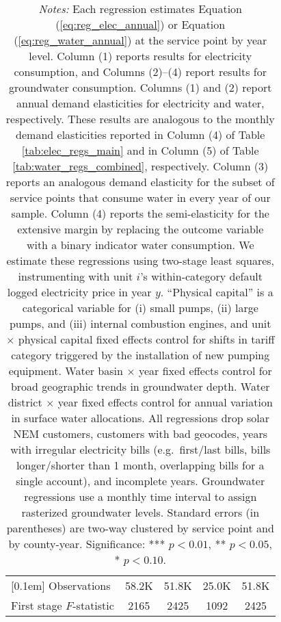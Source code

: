 \begin{table}[t!]
\begin{adjustbox}{center}
\begin{tabular}{lcccc}
[0.1em] 
Observations & 58.2K  & 51.8K & 25.0K & 51.8K \\ 
[0.1em] 
First stage $F$-statistic & 2165  & 2425 & 1092 & 2425 \\ 
[0.15em]
\hline
\end{tabular}
\end{adjustbox}
\captionsetup{width=\textwidth}
\caption*{\scriptsize \emph{Notes:} Each regression estimates Equation (\ref{eq:reg_elec_annual}) or Equation (\ref{eq:reg_water_annual}) at the service point by year level.
Column (1) reports results for electricity consumption, and Columns (2)--(4) report results for groundwater consumption.
Columns (1) and (2) report annual demand elasticities for electricity and water, respectively. These results are analogous to the monthly demand elasticities reported 
in Column (4) of Table \ref{tab:elec_regs_main} and in Column (5) of Table \ref{tab:water_regs_combined}, respectively.
Column (3) reports an analogous demand elasticity for the subset of service points that consume water in every year of our sample.
Column (4) reports the semi-elasticity for the extensive margin by replacing the outcome variable with a binary indicator water consumption.
We estimate these regressions using two-stage least squares, instrumenting with unit $i$'s within-category default logged electricity price in year $y$.
``Physical capital'' is a categorical variable for (i) small pumps, (ii) large pumps, and (iii) internal combustion engines, and unit $\times$
physical capital fixed effects control for shifts in tariff category triggered by the installation of new pumping equipment.
Water basin $\times$ year fixed effects control for broad geographic trends in groundwater depth.
Water district $\times$ year fixed effects control for annual variation in surface water allocations.
All regressions drop solar NEM customers, customers with bad geocodes, years with irregular electricity bills
(e.g.\ first/last bills, bills longer/shorter than 1 month, overlapping bills for a single account), and incomplete years.
Groundwater regressions use a monthly time interval to assign rasterized groundwater levels.
Standard errors (in parentheses) are two-way clustered by service point and by county-year.
Significance: *** $p < 0.01$, ** $p < 0.05$, * $p < 0.10$.
}
\end{table}
